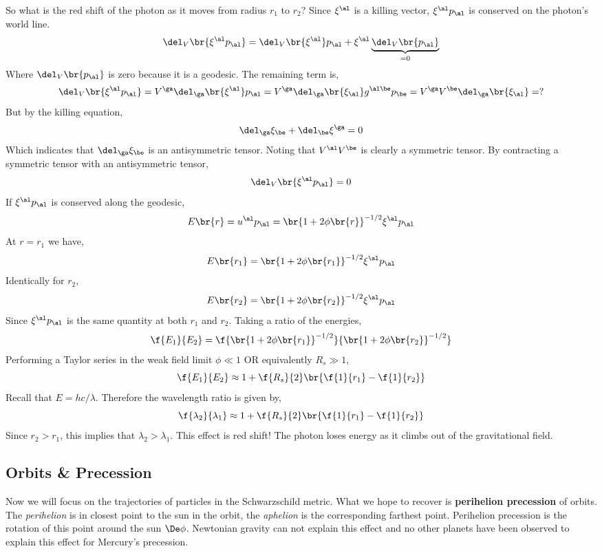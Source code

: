 \documentclass{article}
\begin{document}
So what is the red shift of the photon as it moves from radius $r_1$ to $r_2$? Since $\xi^\al$ is a killing vector, $\xi^\al p_\al$ is conserved on the photon's world line.
\[ \del_{V}\br{\xi^\al p_\al} = \del_{V}\br{\xi^\al} p_\al + \xi^\al \underbrace{\del_{V}\br{p_\al}}_{=0} \]
Where $\del_{V}\br{p_\al}$ is zero because it is a geodesic. The remaining term is,
\[ \del_{V}\br{\xi^\al p_\al} = V^\ga \del_{\ga}\br{\xi^\al} p_\al = V^\ga \del_{\ga}\br{\xi_\al} g^{\al\be} p_\be = V^\ga V^\be \del_{\ga}\br{\xi_\al} = ? \]
But by the killing equation,
\[ \del_\ga \xi_\be + \del_\be \xi^\ga = 0 \]
Which indicates that $\del_\ga \xi_\be$ is an antisymmetric tensor. Noting that $V^\al V^\be$ is clearly a symmetric tensor. By contracting a symmetric tensor with an antisymmetric tensor,
\[ \del_{V}\br{\xi^\al p_\al} = 0 \]
If $\xi^\al p_\al$ is conserved along the geodesic,
\[ E\br{r} = u^\al p_\al = \br{1+2\phi\br{r}}^{-1/2} \xi^\al p_\al \]
At $r=r_1$ we have,
\[ E\br{r_1} = \br{1+2\phi\br{r_1}}^{-1/2} \xi^\al p_\al \]
Identically for $r_2$,
\[ E\br{r_2} = \br{1+2\phi\br{r_2}}^{-1/2} \xi^\al p_\al \]
Since $\xi^\al p_\al$ is the same quantity at both $r_1$ and $r_2$. Taking a ratio of the energies,
\[ \f{E_1}{E_2} = \f{\br{1+2\phi\br{r_1}}^{-1/2}}{\br{1+2\phi\br{r_2}}^{-1/2}} \]
Performing a Taylor series in the weak field limit $\phi \ll 1$ OR equivalently $R_s \gg 1$,
\[ \f{E_1}{E_2} \approx 1+\f{R_s}{2}\br{\f{1}{r_1} - \f{1}{r_2}} \]
Recall that $E = hc /\lambda$. Therefore the wavelength ratio is given by,
\[ \f{\lambda_2}{\lambda_1} \approx 1+\f{R_s}{2}\br{\f{1}{r_1} - \f{1}{r_2}} \]
Since $r_2 > r_1$, this implies that $\lambda_2 > \lambda_1$. This effect is red shift! The photon loses energy as it climbs out of the gravitational field.

\subsection{Orbits \& Precession}
Now we will focus on the trajectories of particles in the Schwarzschild metric. What we hope to recover is \textbf{perihelion precession} of orbits. The \textit{perihelion} is in closest point to the sun in the orbit, the \textit{aphelion} is the corresponding farthest point. Perihelion precession is the rotation of this point around the sun $\De \phi$. Newtonian gravity can not explain this effect and no other planets have been observed to explain this effect for Mercury's precession.\\
\end{document}
